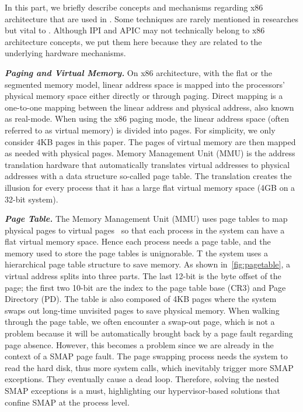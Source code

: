 In this part, we briefly describe concepts and mechanisms regarding x86 architecture that are used in \name. Some techniques are rarely mentioned in researches but vital to \name. Although IPI and APIC may not technically belong to x86 architecture concepts, we put them here because they are related to the underlying hardware mechanisms.


\textbf{\textit{Paging and Virtual Memory.}} On x86 architecture, with the flat or the segmented memory model, linear address space is mapped into the processors' physical memory space either directly or through paging.  Direct mapping is a one-to-one mapping between the linear address and physical address, also known as real-mode. When using the x86 paging mode, the linear address space (often referred to as virtual memory) is divided into pages. For simplicity, we only consider 4KB pages in this paper. The pages of virtual memory are then mapped as needed with physical pages. Memory Management Unit (MMU) is the address translation hardware that automatically translates virtual addresses to physical addresses with a data structure so-called page table. The translation creates the illusion for every process that it has a large flat virtual memory space (4GB on a 32-bit system). 



\textbf{\textit{Page Table.}} The Memory Management Unit (MMU) uses page tables to map physical pages to virtual pages~\cite{intelpaging} so that each process in the system can have a flat virtual memory space. Hence each process needs a page table, and the memory used to store the page tables is unignorable. T the system uses a hierarchical page table structure to save memory. As shown in~\autoref{fig:pagetable}, a virtual address splits into three parts. The last 12-bit is the byte offset of the page;  the first two 10-bit are the index to the page table base (CR3) and Page Directory (PD). The table is also composed of 4KB pages where the system swaps out long-time unvisited pages to save physical memory. When walking through the page table, we often encounter a swap-out page, which is not a problem because it will be automatically brought back by a page fault regarding page absence. However, this becomes a problem since we are already in the context of a SMAP page fault. The page swapping process needs the system to read the hard disk, thus more system calls, which inevitably trigger more SMAP exceptions. They eventually cause a dead loop.  Therefore, solving the nested SMAP exceptions is a must, highlighting our hypervisor-based solutions that confine SMAP at the process level.

